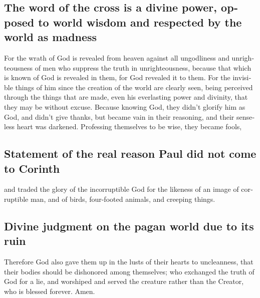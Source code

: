 \begin{paracol}{2}
\begin{otherlanguage}{english}
\hypertarget{the-word-of-the-cross-is-a-divine-power-opposed-to-world-wisdom-and-respected-by-the-world-as-madness}{%
\subsection{The word of the cross is a divine power, opposed to world
wisdom and respected by the world as
madness}\label{the-word-of-the-cross-is-a-divine-power-opposed-to-world-wisdom-and-respected-by-the-world-as-madness}}

 For the wrath of God is revealed from heaven against all
ungodliness and unrighteousness of men who suppress the truth in
unrighteousness,  because that which is known of God is
revealed in them, for God revealed it to them.  For the
invisible things of him since the creation of the world are clearly
seen, being perceived through the things that are made, even his
everlasting power and divinity, that they may be without excuse.
 Because knowing God, they didn't glorify him as God, and
didn't give thanks, but became vain in their reasoning, and their
senseless heart was darkened.  Professing themselves to
be wise, they became fools,

\hypertarget{statement-of-the-real-reason-paul-did-not-come-to-corinth}{%
\subsection{Statement of the real reason Paul did not come to
Corinth}\label{statement-of-the-real-reason-paul-did-not-come-to-corinth}}

 and traded the glory of the incorruptible God for the
likeness of an image of corruptible man, and of birds, four-footed
animals, and creeping things.

\hypertarget{divine-judgment-on-the-pagan-world-due-to-its-ruin}{%
\subsection{Divine judgment on the pagan world due to its
ruin}\label{divine-judgment-on-the-pagan-world-due-to-its-ruin}}

 Therefore God also gave them up in the lusts of their
hearts to uncleanness, that their bodies should be dishonored among
themselves;  who exchanged the truth of God for a lie,
and worshiped and served the creature rather than the Creator, who is
blessed forever. Amen.


\end{otherlanguage}
\end{paracol}
